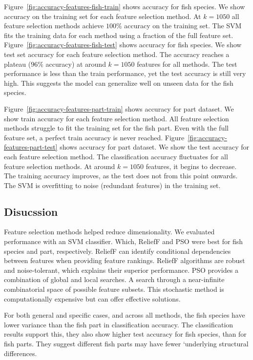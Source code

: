 \documentclass[runningheads]{llncs}
\begin{document}
Figure~\ref{fig:accuracy-features-fish-train} shows accuracy for fish species.
We show accuracy on the training set for each feature selection method.
At $k=1050$ all feature selection methods achieve $100\%$ accuracy on the training set.
The SVM fits the training data for each method using a fraction of the full feature set.
Figure~\ref{fig:accuracy-features-fish-test} shows accuracy for fish species.
We show test set accuracy for each feature selection method.
The accuracy reaches a plateau ($96\%$ accuracy) at around $k=1050$ features for all methods.
The test performance is less than the train performance, yet the test accuracy is still very high.
This suggests the model can generalize well on unseen data for the fish species.

Figure~\ref{fig:accuracy-features-part-train} shows accuracy for part dataset.
We show train accuracy for each feature selection method.
All feature selection methods struggle to fit the training set for the fish part.
Even with the full feature set, a perfect train accuracy is never reached.
Figure~\ref{fig:accuracy-features-part-test} shows accuracy for part dataset.
We show the test accuracy for each feature selection method.
The classification accuracy fluctuates for all feature selection methods.
At around $k=1050$ features, it begins to decrease.
The training accuracy improves, as the test does not from this point onwards.
The SVM is overfitting to noise (redundant features) in the training set.

\subsection{Disucssion}
\label{sec:results-feature-selection-discussion}

Feature selection methods helped reduce dimensionality.
We evaluated performance with an SVM classifier.
Which, ReliefF and PSO were best for fish species and part, respectively.
ReliefF can identify conditional dependencies between features when providing feature rankings.
ReliefF algorithms are robust and noise-tolerant, which explains their superior performance.
PSO provides a combination of global and local searches.
A search through a near-infinite combinatorial space of possible feature subsets.
This stochastic method is computationally expensive but can offer effective solutions.

For both general and specific cases, and across all methods, the fish species have lower variance than the fish part in classification accuracy.
The classification results support this, they also show higher test accuracy for fish species, than for fish parts.
They suggest different fish parts may have fewer `underlying structural differences.
\end{document}
